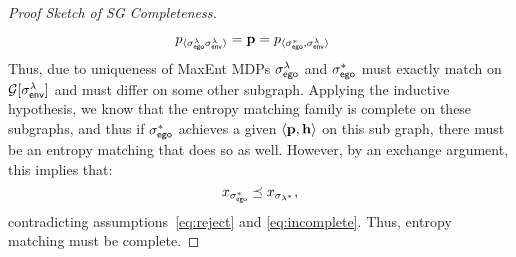 \begin{proof}[Proof Sketch of SG Completeness]
\begin{equation}
\begin{split}
      &p_{\langle \sigma_{\mathsf{ego}}^\lambda \sigma_{\mathsf{env}}^\lambda\rangle} = \mathbf{p} = p_{\langle \sigma_{\mathsf{ego}}^*, \sigma_{\mathsf{env}}^\lambda\rangle}  
    \end{split}
  \end{equation}
  Thus, due to uniqueness of MaxEnt MDPs $\sigma_{\mathsf{ego}}^\lambda$ and
  $\sigma_{\mathsf{ego}}^*$ must exactly match on $\mathcal{G}[\sigma_{\mathsf{env}}^\lambda]$ and
  must differ on some other subgraph.  Applying the inductive
  hypothesis, we know that the entropy matching family is complete on
  these subgraphs, and thus if $\sigma_{\mathsf{ego}}^*$ achieves a given
  $\langle\mathbf{p}, \mathbf{h}\rangle$ on this sub graph, there
  must be an entropy matching that does so as well.  However, by an
  exchange argument, this implies that:
  \begin{equation}
    x_{\sigma_{\mathsf{ego}}^*} \preceq x_{\sigma_{\lambda^*}},
  \end{equation}
  contradicting
  assumptions~\eqref{eq:reject} and \eqref{eq:incomplete}.  Thus,
  entropy matching must be complete.
\end{proof}

